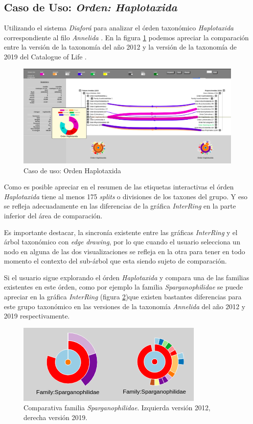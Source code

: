 \documentclass[journal]{IEEEtran}
\begin{document}
\subsection{Caso de Uso: \emph{Orden: Haplotaxida}}
Utilizando el sistema \emph{Diaforá} para analizar el órden taxonómico \emph{Haplotaxida} correspondiente al filo \emph{Annelida} \cite{nguyen_nguyen_tran_blakemore_2016}.
En la figura \ref{haplotaxida} podemos apreciar la comparación entre la versión de la taxonomía del año 2012 y la versión de la taxonomía de 2019 del Catalogue of Life \cite{catalogueoflife}.
\begin{figure}[]
  \centering
  \includegraphics[scale=1.5]{useCaseHaplotaxida.png}
  \caption{Caso de uso: Orden Haplotaxida}
  \label{haplotaxida}
\end{figure}

Como es posible apreciar en el resumen de las etiquetas interactivas el órden \emph{Haplotaxida} tiene al menos 175 \emph{splits} o divisiones de los taxones del grupo.
Y eso se refleja adecuadamente en las diferencias de la gráfica \emph{InterRing} en la parte inferior del área de comparación.


Es importante destacar, la sincronía existente entre las gráficas \emph{InterRing} y el árbol taxonómico con \emph{edge drawing}, por lo que cuando el usuario 
selecciona un nodo en alguna de las dos visualizaciones se refleja en la otra para tener en todo momento el contexto del sub-árbol que esta siendo sujeto de comparación.

Si el usuario sigue explorando el órden \emph{Haplotaxida} y compara una de las familias existentes en este órden, como por ejemplo la familia \emph{Sparganophilidae
} se puede apreciar en la gráfica \emph{InterRing} (figura \ref{sparg_fam})que existen bastantes diferencias para este grupo taxonómico en las versiones de la taxonomía \emph{Annelida} del año 2012 y 2019 respectivamente.

\begin{figure}[]
  \centering
  \includegraphics[scale=2.3]{Sparganophilidae_interring.png}
  \caption{Comparativa familia \emph{Sparganophilidae}. Izquierda versión 2012, derecha versión 2019.}
  \label{sparg_fam}
\end{figure}
\end{document}
